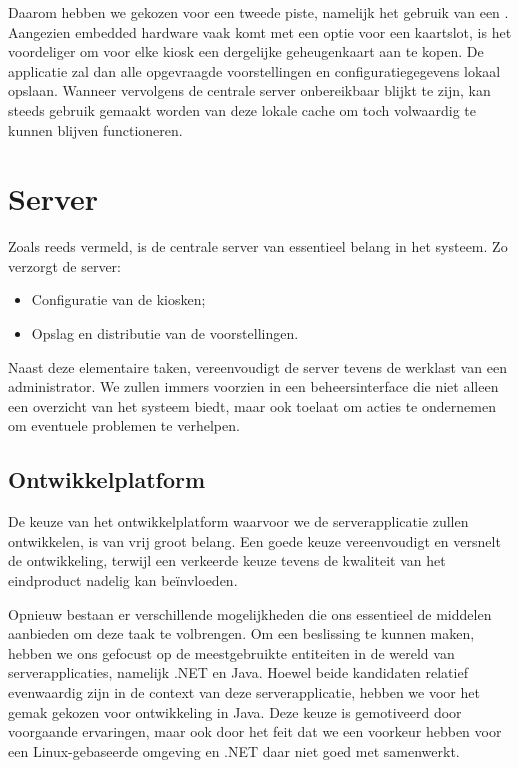 Daarom hebben we gekozen voor een tweede piste, namelijk het gebruik van een . Aangezien embedded hardware vaak komt met een optie voor een kaartslot, is het voordeliger om voor elke kiosk een dergelijke geheugenkaart aan te kopen. De applicatie zal dan alle opgevraagde voorstellingen en configuratiegegevens lokaal opslaan. Wanneer vervolgens de centrale server onbereikbaar blijkt te zijn, kan steeds gebruik gemaakt worden van deze lokale cache om toch volwaardig te kunnen blijven functioneren.

\section{Server}
\label{ontwerp:applicatie:server}

Zoals reeds vermeld, is de centrale server van essentieel belang in het systeem. Zo verzorgt de server:
\begin{itemize}
\item Configuratie van de kiosken;
\item Opslag en distributie van de voorstellingen.
\end{itemize}

Naast deze elementaire taken, vereenvoudigt de server tevens de werklast van een administrator. We zullen immers voorzien in een beheersinterface die niet alleen een overzicht van het systeem biedt, maar ook toelaat om acties te ondernemen om eventuele problemen te verhelpen.

\subsection{Ontwikkelplatform}

De keuze van het ontwikkelplatform waarvoor we de serverapplicatie zullen ontwikkelen, is van vrij groot belang. Een goede keuze vereenvoudigt en versnelt de ontwikkeling, terwijl een verkeerde keuze tevens de kwaliteit van het eindproduct nadelig kan beïnvloeden.

Opnieuw bestaan er verschillende mogelijkheden die ons essentieel de middelen aanbieden om deze taak te volbrengen. Om een beslissing te kunnen maken, hebben we ons gefocust op de meestgebruikte entiteiten in de wereld van serverapplicaties, namelijk .NET en Java. Hoewel beide kandidaten relatief evenwaardig zijn in de context van deze serverapplicatie, hebben we voor het gemak gekozen voor ontwikkeling in Java. Deze keuze is gemotiveerd door voorgaande ervaringen, maar ook door het feit dat we een voorkeur hebben voor een Linux-gebaseerde omgeving en .NET daar niet goed met samenwerkt.

